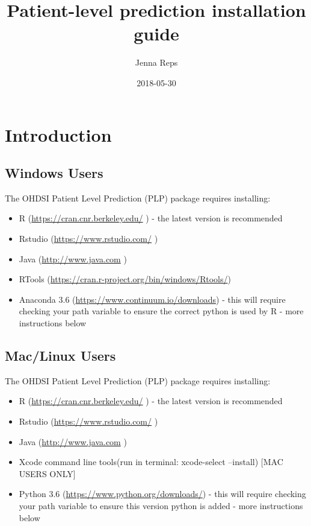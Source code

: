 \documentclass[]{article}
\title{Patient-level prediction installation guide}
\author{Jenna Reps}
\date{2018-05-30}
\providecommand{\tightlist}{%
  \setlength{\itemsep}{0pt}\setlength{\parskip}{0pt}}
\begin{document}
\maketitle

{
\setcounter{tocdepth}{2}
\tableofcontents
}
\newpage

\section{Introduction}\label{introduction}

\subsection{Windows Users}\label{windows-users}

The OHDSI Patient Level Prediction (PLP) package requires installing:

\begin{itemize}
\tightlist
\item
  R (\url{https://cran.cnr.berkeley.edu/} ) - the latest version is
  recommended
\item
  Rstudio (\url{https://www.rstudio.com/} )
\item
  Java (\url{http://www.java.com} )
\item
  RTools (\url{https://cran.r-project.org/bin/windows/Rtools/})
\item
  Anaconda 3.6 (\url{https://www.continuum.io/downloads}) - this will
  require checking your path variable to ensure the correct python is
  used by R - more instructions below
\end{itemize}

\hypertarget{maclinux-users}{\subsection{Mac/Linux
Users}\label{maclinux-users}}

The OHDSI Patient Level Prediction (PLP) package requires installing:

\begin{itemize}
\tightlist
\item
  R (\url{https://cran.cnr.berkeley.edu/} ) - the latest version is
  recommended
\item
  Rstudio (\url{https://www.rstudio.com/} )
\item
  Java (\url{http://www.java.com} )
\item
  Xcode command line tools(run in terminal: xcode-select --install)
  {[}MAC USERS ONLY{]}
\item
  Python 3.6 (\url{https://www.python.org/downloads/}) - this will
  require checking your path variable to ensure this version python is
  added - more instructions below
\end{itemize}
\end{document}
